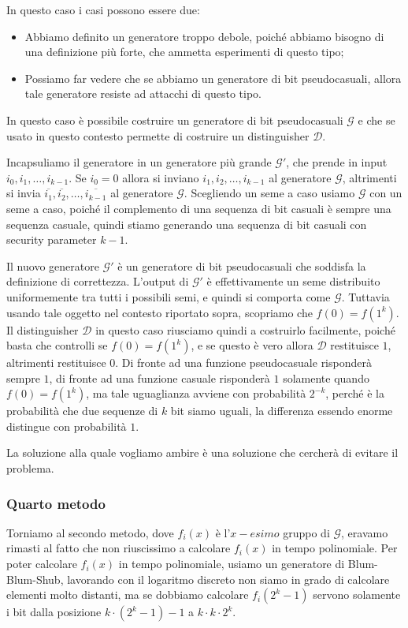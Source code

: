 In questo caso i casi possono essere due:
\begin{itemize}
  \item Abbiamo definito un generatore troppo debole, poiché 
  abbiamo bisogno di una definizione più forte, che ammetta 
  esperimenti di questo tipo;
  \item Possiamo far vedere che se abbiamo un generatore di bit 
  pseudocasuali, allora tale generatore resiste ad attacchi di questo
  tipo.
\end{itemize}
In questo caso è possibile costruire un generatore di bit pseudocasuali
$\mathcal{G}$ e che se usato in questo contesto permette di costruire un 
distinguisher $\mathcal{D}$.

Incapsuliamo il generatore in un generatore più grande $\mathcal{G}'$, che prende in 
input $i_0, i_1, \dots, i_{k-1}$. Se $i_0 = 0$ allora si inviano 
$i_1, i_2, \dots, i_{k-1}$ al generatore $\mathcal{G}$, altrimenti
si invia $\overline{i_1}, \overline{i_2}, \dots, \overline{i_{k-1}}$
al generatore $\mathcal{G}$.
Scegliendo un seme a caso usiamo $\mathcal{G}$ con un seme a caso,
poiché il complemento di una sequenza di bit casuali è sempre una 
sequenza casuale, quindi stiamo generando una sequenza di bit casuali con 
security parameter $k-1$.

Il nuovo generatore $\mathcal{G}'$ è un generatore di bit pseudocasuali
che soddisfa la definizione di correttezza. L'output di $\mathcal{G}'$
è effettivamente un seme distribuito 
uniformemente tra tutti i possibili semi, e quindi si comporta 
come $\mathcal{G}$. Tuttavia usando tale oggetto nel contesto 
riportato sopra, scopriamo che $f(0) = f(1^k)$. Il distinguisher 
$\mathcal{D}$ in questo caso riusciamo quindi a costruirlo facilmente,
poiché basta che controlli se $f(0) = f(1^k)$, e se questo è vero
allora $\mathcal{D}$ restituisce $1$, altrimenti restituisce $0$. Di fronte 
ad una funzione pseudocasuale risponderà sempre $1$, di fronte ad 
una funzione casuale risponderà $1$ solamente quando $f(0) = f(1^k)$,
ma tale uguaglianza avviene con probabilità $2^{-k}$, perché 
è la probabilità che due sequenze di $k$ bit siamo uguali, la differenza 
essendo enorme distingue con probabilità $1$.

La soluzione alla quale vogliamo ambire è una soluzione che cercherà 
di evitare il problema.
\subsubsection{Quarto metodo}
Torniamo al secondo metodo, dove $f_i(x)$ è l'$x-esimo$ gruppo di 
$\mathcal{G}$, eravamo rimasti al fatto che non riuscissimo a calcolare 
$f_i(x)$ in tempo polinomiale. Per poter calcolare $f_i(x)$ in tempo
polinomiale, usiamo un generatore di Blum-Blum-Shub, lavorando con il 
logaritmo discreto non siamo in grado di calcolare elementi molto distanti,
ma se dobbiamo calcolare $f_i(2^k - 1)$ servono solamente i bit dalla 
posizione $k \cdot (2^k - 1) - 1$ a $k \cdot k \cdot 2^k$.

